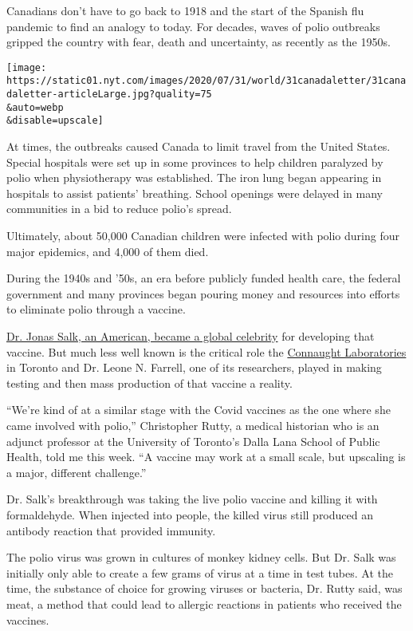 Canadians don't have to go back to 1918 and the start of the Spanish flu
pandemic to find an analogy to today. For decades, waves of polio
outbreaks gripped the country with fear, death and uncertainty, as
recently as the 1950s.

\texttt{[image: https://static01.nyt.com/images/2020/07/31/world/31canadaletter/31canadaletter-articleLarge.jpg?quality=75\\\&auto=webp\\\&disable=upscale]}

At times, the outbreaks caused Canada to limit travel from the United
States. Special hospitals were set up in some provinces to help children
paralyzed by polio when physiotherapy was established. The iron lung
began appearing in hospitals to assist patients' breathing. School
openings were delayed in many communities in a bid to reduce polio's
spread.

Ultimately, about 50,000 Canadian children were infected with polio
during four major epidemics, and 4,000 of them died.

During the 1940s and '50s, an era before publicly funded health care,
the federal government and many provinces began pouring money and
resources into efforts to eliminate polio through a vaccine.

\href{https://www.sciencehistory.org/historical-profile/jonas-salk-and-albert-bruce-sabin}{Dr.
Jonas Salk, an American, became a global celebrity} for developing that
vaccine. But much less well known is the critical role the
\href{https://connaught.research.utoronto.ca/history/}{Connaught
Laboratories} in Toronto and Dr. Leone N. Farrell, one of its
researchers, played in making testing and then mass production of that
vaccine a reality.

``We're kind of at a similar stage with the Covid vaccines as the one
where she came involved with polio,'' Christopher Rutty, a medical
historian who is an adjunct professor at the University of Toronto's
Dalla Lana School of Public Health, told me this week. ``A vaccine may
work at a small scale, but upscaling is a major, different challenge.''

Dr. Salk's breakthrough was taking the live polio vaccine and killing it
with formaldehyde. When injected into people, the killed virus still
produced an antibody reaction that provided immunity.

The polio virus was grown in cultures of monkey kidney cells. But Dr.
Salk was initially only able to create a few grams of virus at a time in
test tubes. At the time, the substance of choice for growing viruses or
bacteria, Dr. Rutty said, was meat, a method that could lead to allergic
reactions in patients who received the vaccines.

